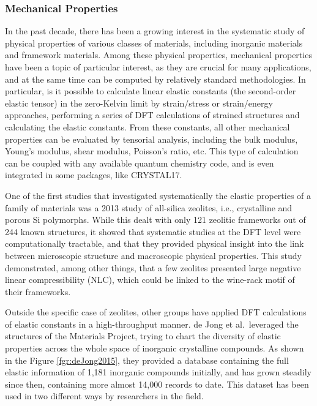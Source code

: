 \documentclass[main.tex]{subfiles}
\begin{document}
\subsubsection{Mechanical Properties}

In the past decade, there has been a growing interest in the systematic study of physical properties of various classes of materials, including inorganic materials and framework materials. Among these physical properties, mechanical properties have been a topic of particular interest, as they are crucial for many applications, and at the same time can be computed by relatively standard methodologies. In particular, is it possible to calculate linear elastic constants (the second-order elastic tensor) in the zero-Kelvin limit by strain/stress or strain/energy approaches, performing a series of DFT calculations of strained structures and calculating the elastic constants. From these constants, all other mechanical properties can be evaluated by tensorial analysis,\cite{Marmier_2010} including the bulk modulus, Young's modulus, shear modulus, Poisson's ratio, etc. This type of calculation can be coupled with any available quantum chemistry code,\cite{Golesorkhtabar_2013} and is even integrated in some packages, like CRYSTAL17.\cite{Dovesi_2018}

One of the first studies that investigated systematically the elastic properties of a family of materials was a 2013 study of all-silica zeolites,\cite{Coudert_2013} i.e., crystalline and porous Si polymorphs. While this dealt with only 121 zeolitic frameworks out of 244 known structures, it showed that systematic studies at the DFT level were computationally tractable, and that they provided physical insight into the link between microscopic structure and macroscopic physical properties. This study demonstrated, among other things, that a few zeolites presented large negative linear compressibility (NLC), which could be linked to the wine-rack motif of their frameworks.

Outside the specific case of zeolites, other groups have applied DFT calculations of elastic constants in a high-throughput manner. de Jong et al.\ leveraged the structures of the Materials Project\cite{Matgenome, Jain_2013}, trying to chart the diversity of elastic properties across the whole space of inorganic crystalline compounds.\cite{deJong_2015} As shown in the Figure \ref{fgr:deJong2015}, they provided a database containing the full elastic information of 1,181 inorganic compounds initially, and has grown steadily since then, containing more almost 14,000 records to date.\cite{MaterialsProject} This dataset has been used in two different ways by researchers in the field.
\end{document}
